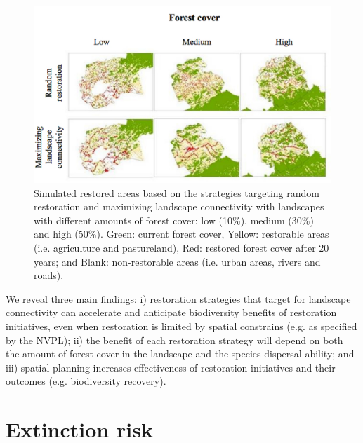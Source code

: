 \newpage

\begin{figure}[H]
\includegraphics[width=1.0\linewidth]{pictureve/Bio-Renatinho-2.pdf}
\caption{Simulated restored areas based on the strategies targeting random restoration and maximizing landscape connectivity with landscapes with different amounts of forest cover: low (10\%), medium (30\%) and high (50\%). Green: current forest cover, Yellow: restorable areas (i.e. agriculture and pastureland), Red: restored forest cover after 20 years; and Blank: non-restorable areas (i.e. urban areas, rivers and roads). }
\label{fig:Bio-Renatinho-2}
\end{figure}

We reveal three main findings: i) restoration strategies that target for landscape connectivity can accelerate and anticipate biodiversity benefits of restoration initiatives, even when restoration is limited by spatial constrains (e.g. as specified by the NVPL); ii) the benefit of each restoration strategy will depend on both the amount of forest cover in the landscape  and the species dispersal ability; and iii) spatial planning increases effectiveness of restoration initiatives and their outcomes (e.g. biodiversity recovery). \\





\section{\Large Extinction risk }\label{sec:bio-extinct}

